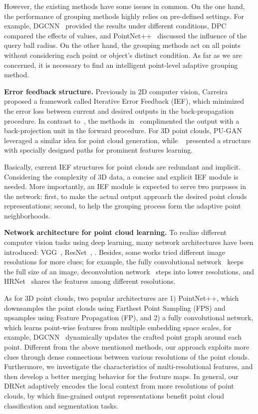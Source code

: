 \documentclass[10pt,twocolumn,letterpaper]{article}
\begin{document}
However, the existing methods have some issues in common. On the one hand, the performance of grouping methods highly relies on pre-defined settings. For example, DGCNN~\cite{wang2019dynamic} provided the results under different  conditions, DPC~\cite{engelmann2019dilated} compared the effects of  values, and PointNet++~\cite{qi2017pointnet++} discussed the influence of the query ball radius. On the other hand, the grouping methods act on all points without considering each point or object's distinct condition. As far as we are concerned, it is necessary to find an intelligent point-level adaptive grouping method.

\noindent \textbf{Error feedback structure.} Previously in 2D computer vision, Carreira~\etal~\cite{carreira2016human} proposed a framework called Iterative Error Feedback (IEF), which minimized the error loss between current and desired outputs in the back-propagation procedure. In contrast to~\cite{carreira2016human}, the methods in~\cite{haris2018deep, liu2019hierarchical} complimented the output with a back-projection unit in the forward procedure. For 3D point clouds, PU-GAN~\cite{Li_2019_ICCV} leveraged a similar idea for point cloud generation, while ~\cite{qiu2019geometric} presented a structure with specially designed paths for prominent features learning.

Basically, current IEF structures for point clouds are redundant and implicit. Considering the complexity of 3D data, a concise and explicit IEF module is needed. More importantly, an IEF module is expected to serve two purposes in the network: first, to make the actual output approach the desired point clouds representations; second, to help the grouping process form the adaptive point neighborhoods. 

\noindent \textbf{Network architecture for point cloud learning.}   To realize different computer vision tasks using deep learning, many network architectures have been introduced: VGG~\cite{simonyan2014very}, ResNet~\cite{he2016deep}, \etc. Besides, some works tried different image resolutions for more clues; for example, the fully convolutional network~\cite{long2015fully} keeps the full size of an image, deconvolution network~\cite{noh2015learning} steps into lower resolutions, and HRNet~\cite{wang2019deep} shares the features among different resolutions.

As for 3D point clouds, two popular architectures are 1) PointNet++\cite{qi2017pointnet++}, which downsamples the point clouds using Farthest Point Sampling (FPS) and upsamples using Feature Propagation (FP), and 2) a fully convolutional network,  which learns point-wise features from multiple embedding space scales, for example, DGCNN~\cite{wang2019dynamic} dynamically updates the crafted point graph around each point. Different from the above mentioned methods, our approach exploits more clues through dense connections between various resolutions of the point clouds. Furthermore, we investigate the characteristics of multi-resolutional features, and then develop a better merging behavior for the feature maps. In general, our DRNet adaptively encodes the local context from more resolutions of point clouds, by which fine-grained output representations benefit point cloud classification and segmentation tasks.
\end{document}
